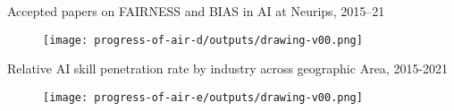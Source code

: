 %
%
%
%

{

\begin{frame}{
Accepted papers on FAIRNESS and BIAS in AI at Neurips, 2015–21
}

\begin{figure}
 \centering
 \texttt{[image: progress-of-air-d/outputs/drawing-v00.png]}
\end{figure}

\end{frame}
}


{

\begin{frame}{
Relative AI skill penetration rate by industry across geographic Area, 2015-2021
}

\begin{figure}
 \centering
 \texttt{[image: progress-of-air-e/outputs/drawing-v00.png]}
\end{figure}

\end{frame}
}



